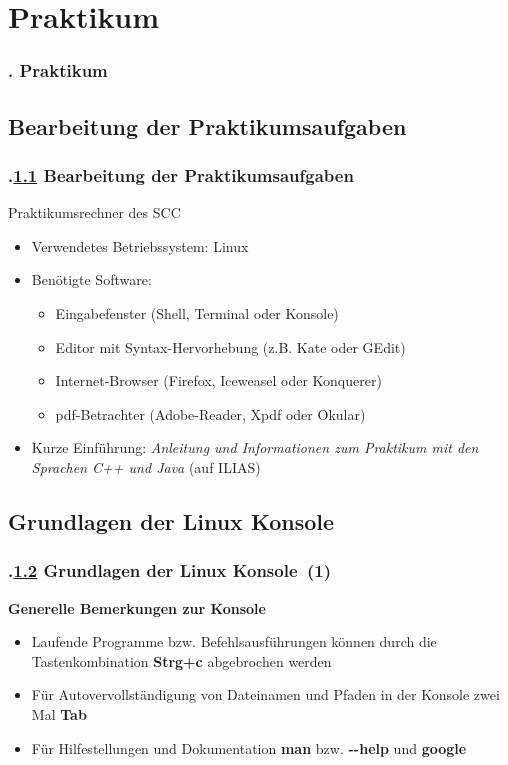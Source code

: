 \AtBeginSection{}
\section{Praktikum}
\begin{frame}
  \frametitle{\kap. Praktikum}%
\tableofcontents[currentsection]
\end{frame}


\def\stitle{Bearbeitung der Praktikumsaufgaben}%
\subsection{\stitle}\label{S:PraktikumSCC}
\begin{frame}[t]%
  \frametitle{\kap.\ref{S:PraktikumSCC} \stitle}%
\medskip

Praktikumsrechner des SCC
\begin{itemize}
  \item Verwendetes Betriebssystem: Linux
  \item Ben\"otigte Software:
  \begin{itemize}
    \item Eingabefenster (Shell, Terminal oder Konsole)
    \item Editor mit Syntax-Hervorhebung (z.B. Kate oder GEdit)
    \item Internet-Browser (Firefox, Iceweasel oder Konquerer)
    \item pdf-Betrachter (Adobe-Reader, Xpdf oder Okular)
  \end{itemize}
  \item Kurze Einf\"uhrung: \emph{Anleitung und Informationen zum Praktikum mit den Sprachen C++ und Java} (auf ILIAS)
\end{itemize}
\end{frame}


\def\stitle{Grundlagen der Linux Konsole}%
\subsection{\stitle}\label{S:Anleitung}
\begin{frame}[t]%
\frametitle{\kap.\ref{S:Anleitung} \stitle\ (1)}%
\medskip

\textbf{Generelle Bemerkungen zur Konsole}
\begin{itemize}
  \item Laufende Programme bzw. Befehlsausf\"uhrungen k\"onnen durch die Tastenkombination \textbf{Strg+c} abgebrochen werden
  \item F\"ur Autovervollst\"andigung von Dateinamen und Pfaden in der Konsole zwei Mal \textbf{Tab}
  \item F\"ur Hilfestellungen und Dokumentation \textbf{man} bzw. \textbf{-{}-help} und \textbf{google}
\end{itemize}

\end{frame}


